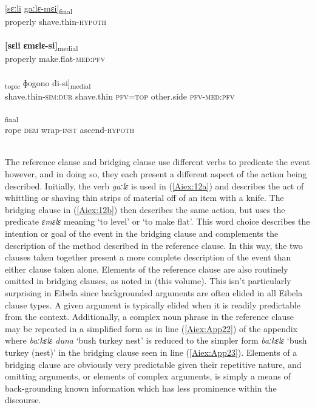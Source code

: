 \documentclass[output=paper]{LSP/langsci}
\begin{document}
\begin{exe}
\ex \label{Aiex:12ad}
\begin{xlist}
\ex \label{Aiex:12a}
\gll \underline{[sɛːli}	\underline{gaːlɛ-mɛi]}\textsubscript{final}\\
properly	shave.thin-\textsc{hypoth}\\
\glt {}\\
\ex \label{Aiex:12b}
\gll \textbf{[sɛli}	\textbf{ɛmɛlɛ-si]}\textsubscript{medial}\\
properly	make.flat-\textsc{med}:\textsc{pfv}\\
\glt {}\\
\ex \label{Aiex:12c}
\gll [[gaːjɛ-liːː	gaːlɛ	di=jaː]\textsubscript{topic}	ɸogono	di-si]\textsubscript{medial}\\
shave.thin-\textsc{sim}:\textsc{dur}	shave.thin	\textsc{pfv}=\textsc{top}	other.side	\textsc{pfv}-\textsc{med}:\textsc{pfv}\\
\glt {}\\
\ex \label{Aiex:12d}
\textsubscript{final}\\
rope	\textsc{dem}	wrap-\textsc{inst}	ascend-\textsc{hypoth}\\
\glt	{}\\
\end{xlist}
\end{exe}

The reference clause and bridging clause use different verbs to predicate the event however, and in doing so, they each present a different aspect of the action being described. Initially, the verb  \textit{gaːlɛ} is used in (\ref{Aiex:12a}) and describes the act of whittling or shaving thin strips of material off of an item with a knife. The bridging clause in (\ref{Aiex:12b}) then describes the same action, but uses the predicate \textit{ɛmɛlɛ} meaning `to level' or `to make flat'. This word choice describes the intention or goal of the event in the bridging clause and complements the description of the method described in the reference clause. In this way, the two clauses taken together present a more complete description of the event than either clause taken alone.
	Elements of the reference clause are also routinely omitted in bridging clauses, as noted in \citeauthor{guerin18} (this volume). This isn’t particularly surprising in Eibela since backgrounded arguments are often elided in all Eibela clause types. A given argument is typically elided when it is readily predictable from the context. Additionally, a complex noun phrase in the reference clause may be repeated in a simplified form as in line (\ref{Aiex:App22}) of the appendix where \textit{baːkɛlɛ duna} `bush turkey nest' is reduced to the simpler form \textit{baːkɛlɛ} `bush turkey (nest)' in the bridging clause seen in line (\ref{Aiex:App23}). Elements of a bridging clause are obviously very predictable given their repetitive nature, and omitting arguments, or elements of complex arguments, is simply a means of back-grounding known information which has less prominence within the discourse.
\end{document}
